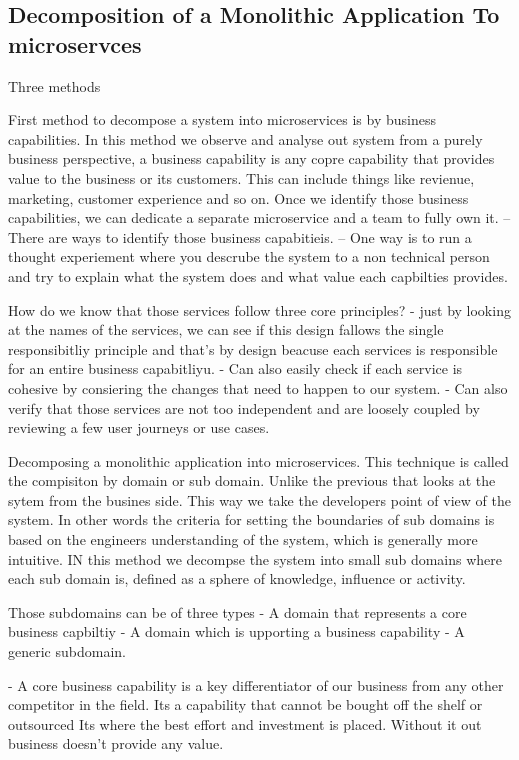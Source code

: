 \documentclass[a4paper, 11pt]{book}
\begin{document}
    \subsection{Decomposition of a Monolithic Application To microservces}
    Three methods

    First method to decompose a system into microservices is by business capabilities.
    In this method we observe and analyse out system from a purely business perspective, a business capability is any copre capability that provides value to the business or its customers.
    This can include things like revienue, marketing, customer experience and so on.
    Once we identify those business capabilities, we can dedicate a separate microservice and a team to fully own it.
    -- There are ways to identify those business capabitieis.
    -- One way is to run a thought experiement where you descrube the system to a non technical person and try to explain what the system does and what value each capbilties provides.

    How do we know that those services follow three core principles?
    - just by looking at the names of the services, we can see if this design fallows the single responsibitliy principle
    and that's by design beacuse each services is responsible for an entire business capabitliyu.
    - Can also easily check if each service is cohesive by consiering the changes that need to happen to our system.
    - Can also verify that those services are not too independent and are loosely coupled by reviewing a few user journeys or use cases.

    Decomposing a monolithic application into microservices.
    This technique is called the compisiton by domain or sub domain.
    Unlike the previous that looks at the sytem from the busines side.
    This way we take the developers point of view of the system.
    In other words the criteria for setting the boundaries of sub domains is based on the engineers understanding of the system, which is generally more intuitive.
    IN this method we decompse the system into small sub domains where each sub domain is, defined as a sphere of knowledge, influence or activity.

    Those subdomains can be of three types
    - A domain that represents a core business capbiltiy
    - A domain which is upporting a business capability
    - A generic subdomain.

    - A core business capability is a key differentiator of our business from any other competitor in the field.
    Its a capability that cannot be bought off the shelf or outsourced
    Its where the best effort and investment is placed.
    Without it out business doesn't provide any value.
\end{document}
